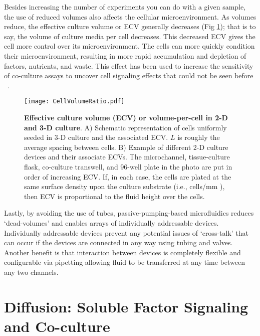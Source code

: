 Besides increasing the number of experiments you can do with a given sample, the use of reduced volumes also affects the cellular microenvironment. As volumes reduce, the effective culture volume or ECV generally decreases (Fig \ref{chap1:fig:cellVolumeRatio}); that is to say, the volume of culture media per cell decreases. This decreased ECV gives the cell more control over its microenvironment. The cells can more quickly condition their microenvironment, resulting in more rapid accumulation and depletion of factors, nutrients, and waste. This effect has been used to increase the sensitivity of co-culture assays to uncover cell signaling effects that could not be seen before \invitro\ \cite{Domenech:2009jt}.

\begin{figure}[!ht]
\centering
\texttt{[image: CellVolumeRatio.pdf]}
\caption{\textbf{Effective culture volume (ECV) or volume-per-cell in 2-D and 3-D culture}. A) Schematic representation of cells uniformly seeded in 3-D culture and the associated ECV. $L$ is roughly the average spacing between cells. B) Example of different 2-D culture devices and their associate ECVs. The microchannel, tissue-culture flask, co-culture transwell, and 96-well plate in the photo are put in order of increasing ECV. If, in each case, the cells are plated at the same surface density upon the culture substrate (i.e., cells/mm ), then ECV is proportional to the fluid height over the cells.}
\label{chap1:fig:cellVolumeRatio}
\end{figure}

Lastly, by avoiding the use of tubes, passive-pumping-based microfluidics reduces `dead-volumes' and enables arrays of individually addressable devices. Individually addressable devices prevent any potential issues of `cross-talk' that can occur if the devices are connected in any way using tubing and valves. Another benefit is that interaction between devices is completely flexible and configurable via pipetting allowing fluid to be transferred at any time between any two channels.

\section{Diffusion: Soluble Factor Signaling and Co-culture}

